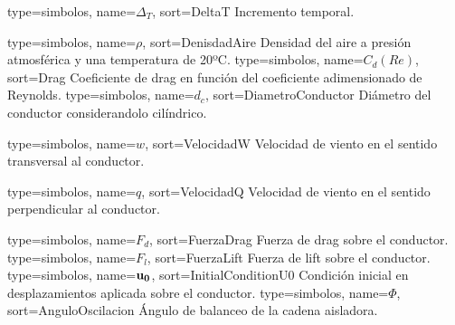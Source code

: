 {
	type={simbolos},
	name={$\Delta_T$}, %
	sort={DeltaT} %
}
{Incremento temporal.}

{
	type={simbolos},
	name={$\rho$}, %
	sort={DenisdadAire} %
}
{Densidad del aire a presión atmosférica y una temperatura de 20ºC.}
{
	type={simbolos},
	name={$C_d(Re)$}, %
	sort={Drag} %
}
{Coeficiente de drag en función del coeficiente adimensionado de Reynolds.}
{
	type={simbolos},
	name={$d_c$}, %
	sort={DiametroConductor} %
}
{Diámetro del conductor considerandolo cilíndrico.}

{
	type={simbolos},
	name={$w$}, %
	sort={VelocidadW} %
}
{Velocidad de viento en el sentido transversal al conductor.}

{
	type={simbolos},
	name={$q$}, %
	sort={VelocidadQ} %
}
{Velocidad de viento en el sentido perpendicular al conductor.}

{
	type={simbolos},
	name={$F_d$}, %
	sort={FuerzaDrag} %
}
{Fuerza de drag sobre el conductor.}
{
	type={simbolos},
	name={$F_l$}, %
	sort={FuerzaLift} %
}
{Fuerza de lift sobre el conductor.}
{
	type={simbolos},
	name={$\bf{u}_0$}, %
	sort={InitialConditionU0} %
}
{Condición inicial en desplazamientos aplicada sobre el conductor.}
{
	type={simbolos},
	name={$\Phi$}, %
	sort={AnguloOscilacion} %
}
{Ángulo de balanceo de la cadena aisladora.}
